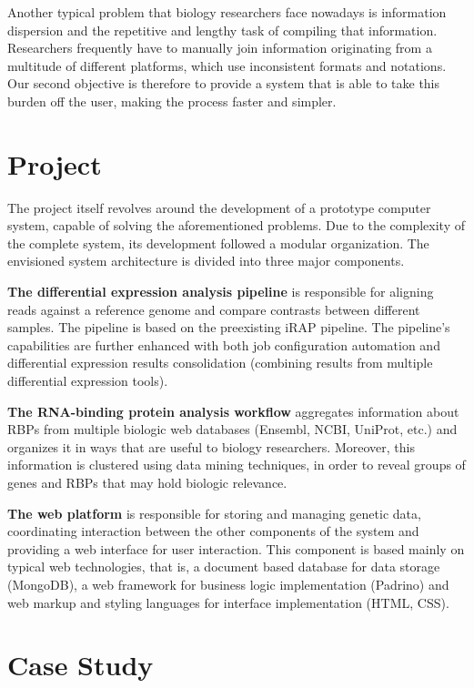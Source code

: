 \documentclass[9pt,a4paper]{extarticle}
\begin{document}
\begin{multicols}{2}
Another typical problem that biology researchers face nowadays is information
dispersion and the repetitive and lengthy task of compiling that information.
Researchers frequently have to manually join information originating from a
multitude of different platforms, which use inconsistent formats and notations.
Our second objective is therefore to provide a system that is able to take this
burden off the user, making the process faster and simpler.

\section{Project} \label{sec:project}

The project itself revolves around the development of a prototype computer
system, capable of solving the aforementioned problems. Due to the complexity
of the complete system, its development followed a modular organization. The
envisioned system architecture is divided into three major components.

  \textbf{The differential expression analysis pipeline}
  is responsible for aligning reads against a reference genome and compare
  contrasts between different samples. The pipeline is based on the preexisting
  iRAP pipeline. The pipeline's capabilities are further enhanced with both job
  configuration automation and differential expression results consolidation
  (combining results from multiple differential expression tools).

  \textbf{The RNA-binding protein analysis workflow}
  aggregates information about RBPs from multiple biologic web databases
  (Ensembl, NCBI, UniProt, etc.) and organizes it in ways that are useful to
  biology researchers. Moreover, this information is clustered using data mining
  techniques, in order to reveal groups of genes and RBPs that may hold biologic
  relevance.

  \textbf{The web platform}
  is responsible for storing and managing genetic data, coordinating interaction
  between the other components of the system and providing a web interface for
  user interaction. This component is based mainly on typical web technologies,
  that is, a document based database for data storage (MongoDB), a web framework
  for business logic implementation (Padrino) and web markup and styling
  languages for interface implementation (HTML, CSS).

\section{Case Study}


\end{multicols}
\end{document}
